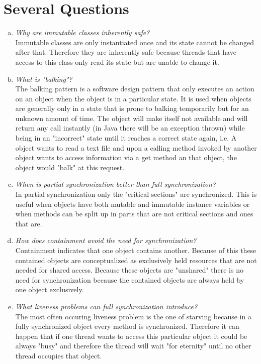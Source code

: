 \documentclass{report}
\author{Marcel \textsc{Zauder} 16-124-836 \\
	Pascal \textsc{Gerig} 16-104-721}
\begin{document}
	\section{Several Questions}
	\startsection
		\begin{enumerate}[a)]
			\item \textit{Why are immutable classes inherently safe?} \\
			Immutable classes are only instantiated once and its state cannot be changed after that. Therefore they are inherently safe because threads that have access to this class only read its state but are unable to change it.
			\item \textit{What is "balking"?} \\
			The balking pattern is a software design pattern that only executes an action on an object when the object is in a particular state. It is used when objects are generally only in a state that is prone to balking temporarily but for an unknown amount of time. The object will make itself not available and will return any call instantly (in Java there will be an exception thrown) while being in an "incorrect" state until it reaches a correct state again, i.e. A object wants to read a text file and upon a calling method invoked by another object wants to access information via a get method an that object, the object would "balk" at this request. 
			\item \textit{When is partial synchronization better than full synchronization?} \\
			In partial synchronization only the "critical sections" are synchronized. This is useful when objects have both mutable and immutable instance variables or when methods can be split up in parts that are not critical sections and ones that are.
			\item \textit{How does containment avoid the need for synchronization?} \\
			Containment indicates that one object contains another. Because of this these contained objects are conceptualized as exclusively held resources that are not needed for shared access. Because these objects are "unshared" there is no need for synchronization because the contained objects are always held by one object exclusively.
			\item \textit{What liveness problems can full synchronization introduce?} \\
			The most often occuring liveness problem is the one of starving because in a fully synchronized object every method is synchronized. Therefore it can happen that if one thread wants to access this particular object it could be always "busy" and therefore the thread will wait "for eternity" until no other thread occupies that object.

\end{enumerate}
\end{document}
